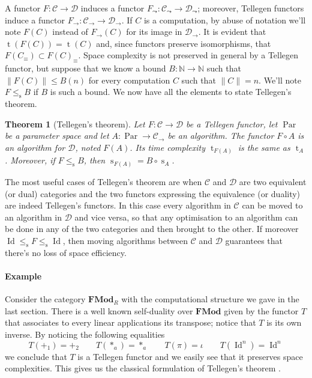 \documentclass{article}
\newcommand{\cat}[1]{\mathscr{#1}}
\newcommand{\lcat}[1]{\mathbf{#1}}
\newcommand{\C}{\cat{C}}
\newcommand{\D}{\cat{D}}
\newcommand{\comp}{\circ}
\newcommand{\size}[1]{\lVert#1\rVert}
\DeclareMathOperator{\Id}{Id}
\newcommand{\N}{\mathbb{N}}
\newcommand{\ra}{\rightarrow}
\DeclareMathOperator{\Time}{t}
\DeclareMathOperator{\Space}{s}
\DeclareMathOperator{\Par}{Par}
\newtheorem{theorem}[definition]{Theorem}
\begin{document}
  A functor $F:\C\ra\D$ induces a functor
  $F_\leadsto:\C_\leadsto\ra\D_\leadsto$; moreover, Tellegen functors
  induce a functor $F_\ra:\C_\ra\ra\D_\ra$. If $C$ is a computation,
  by abuse of notation we'll note $F(C)$ instead of $F_\ra(C)$ for its
  image in $\D_\ra$. It is evident that $\Time(F(C)) = \Time(C)$ and,
  since functors preserve isomorphisms, that $F(C_\equiv) \subset
  F(C)_\equiv$. Space complexity is not preserved in general by a
  Tellegen functor, but suppose that we know a bound $B:\N\ra\N$ such
  that $\size{F(C)} \le B(n)$ for every computation $C$ such that
  $\size{C} = n$. We'll note $F\le_{\Space} B$ if $B$ is such a
  bound. We now have all the elements to state Tellegen's theorem.

  \begin{theorem}[Tellegen's theorem]
    Let $F:\C\ra\D$ be a Tellegen functor, let $\Par$ be a parameter
    space and let $A:\Par\ra\C_\ra$ be an algorithm. The functor
    $F\comp A$ is an algorithm for $\D$, noted $F(A)$. Its time
    complexity $\Time_{F(A)}$ is the same as $\Time_A$. Moreover, if
    $F\le_{\Space} B$, then $\Space_{F(A)} = B\comp\Space_A$.
  \end{theorem}

  The most useful cases of Tellegen's theorem are when $\C$ and $\D$
  are two equivalent (or dual) categories and the two functors
  expressing the equivalence (or duality) are indeed Tellegen's
  functors. In this case every algorithm in $\C$ can be moved to an
  algorithm in $\D$ and vice versa, so that any optimisation to an
  algorithm can be done in any of the two categories and then brought
  to the other. If moreover $\Id\le_{\Space}F\le_{\Space}\Id$, then
  moving algorithms between $\C$ and $\D$ guarantees that there's no
  loss of space efficiency.

  \paragraph{Example}
  Consider the category $\lcat{FMod}_R$ with the computational
  structure we gave in the last section. There is a well known
  self-duality over $\lcat{FMod}$ given by the functor $T$ that
  associates to every linear applications its transpose; notice that
  $T$ is its own inverse. By noticing the following equalities
  \[T(+_1) = +_2 \qquad T(*_a) = *_a \qquad T(\pi) = \iota \qquad T(\Id^n) = \Id^n\]
  we conclude that $T$ is a Tellegen functor and we easily see that it
  preserves space complexities. This gives us the classical
  formulation of Tellegen's theorem \cite{BCS,BLS03}.
\end{document}
